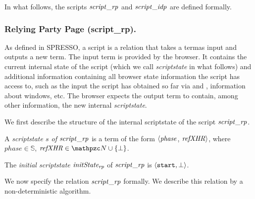   In what follows, the scripts $\mathit{script\_rp}$ and $\mathit{script\_idp}$ are
  defined formally.
  
  \subsubsection{Relying Party Page (script\_rp).}\label{app:uppresso-script-rp}
  As defined in SPRESSO, a script is a relation that takes a termas input and outputs 
  a new term. The input term is provided by the browser. It contains the current 
  internal state of the script (which we call \emph{scriptstate} in what follows) and
  additional information containing all browser state information the
  script has access to, such as the input the script has obtained so far
  via \xhrs and \pms, information about windows, etc. The browser
  expects the output term to contain, among other information, the new internal \emph{scriptstate}.
  
  We first describe the structure of the internal scriptstate
  of the script $\mathit{script\_rp}$.
  
  \begin{definition} \label{def:scriptstaterp} 
  A \emph{scriptstate $s$ of $\mathit{script\_rp}$} is a term of the form $\langle 
  \mathit{phase}$, 
  $\mathit{refXHR}\rangle$, 
  where $phase \in \mathbb{S}$, 
  $\mi{refXHR}\in \nonces \cup \{\bot\}$. 
  
  The \emph{initial scriptstate $\mathit{initState_{rp}}$} of $\mathit{script\_rp}$ is 
  $\langle\mathtt{start},
  \bot\rangle$.
  \end{definition}
  
  We now specify the relation $\mathit{script\_rp}$ formally. We describe this relation
  by a non-deterministic algorithm.
  
